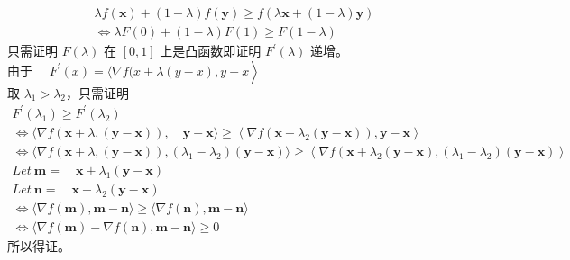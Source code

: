 \documentclass[11pt,letter,notitlepage]{article}
\begin{document}
\begin{solution}
\begin{enumerate}
			\begin{align*}
				\lambda f(\mathbf{x})+(1-\lambda) f(\mathbf{y}) \geqslant f(\lambda \mathbf{x}+(1-\lambda) \mathbf{y}) \\ \Leftrightarrow \lambda F(0)+(1-\lambda) F(1) \geqslant F(1-\lambda)
			\end{align*}
		只需证明 $F(\lambda)$ 在 $[0, 1]$ 上是凸函数即证明 $F^{\prime}(\lambda)$ 递增。\\
		由于 ${\left.\quad F^{\prime}(x)=\langle\nabla f(x+\lambda ( y-x), y-x\right\rangle}$\\
		取 $\lambda_1 > \lambda_2 $，只需证明\\
		$\begin{array}{l} { F^{\prime}(\lambda_1) \geqslant F^{\prime}\left(\lambda_{2}\right)} \\ {\Leftrightarrow \langle \nabla f(\mathbf{x}+\lambda,(\mathbf{y}-\mathbf{x})), \quad \mathbf{y}-\mathbf{x} \rangle\geqslant\left\langle \nabla f\left(\mathbf{x}+\lambda_{2}(\mathbf{y}-\mathbf{x})\right), \mathbf{y}-\mathbf{x}\right\rangle} \\ {\Leftrightarrow \langle \nabla f(\mathbf{x}+\lambda,(\mathbf{y}-\mathbf{x})),\left(\lambda_1-\lambda_{2}\right)(\mathbf{y}-\mathbf{x}) \rangle \geqslant\left\langle\nabla f\left(\mathbf{x}+\lambda_{2}(\mathbf{y}-\mathbf{x}),(\lambda_1 - \lambda_2)(\mathbf{y} - \mathbf{x})\right \rangle \right.} \\ {Let \  \mathbf{m} = \quad \mathbf{x}+\lambda_{1}(\mathbf{y}-\mathbf{x})} \\ {Let \  \mathbf{n} = \quad \mathbf{x}+\lambda_{2}(\mathbf{y}-\mathbf{x})} \\ {\Leftrightarrow \langle\nabla f(\mathbf{m}), \mathbf{m}-\mathbf{n}\rangle \geqslant\langle\nabla f(\mathbf{n}), \mathbf{m}-\mathbf{n}\rangle} \\ {\Leftrightarrow \langle\nabla f(\mathbf{m}) - \nabla f(\mathbf{n}), \mathbf{m}-\mathbf{n}\rangle \geqslant 0} \end{array}$\\
		所以得证。
			
	\end{enumerate}

\end{solution}


\end{document}
